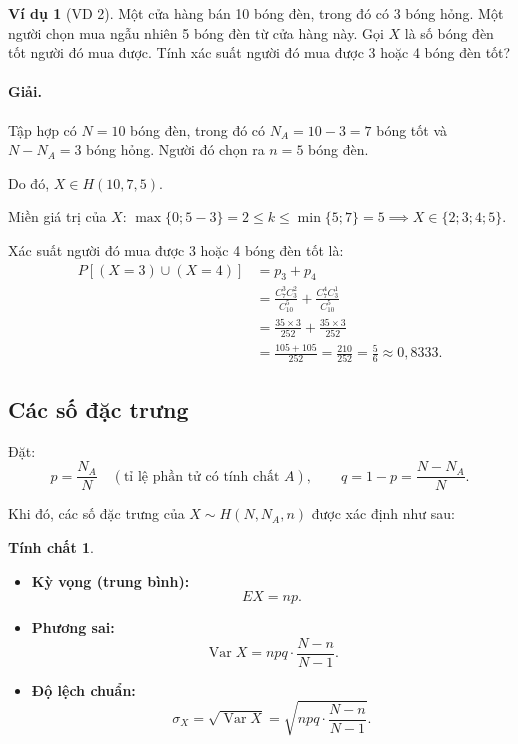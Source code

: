\documentclass[12pt,a4paper]{article}
\theoremstyle{definition}
\newtheorem{vidu}{Ví dụ}[section]
\newtheorem{tinhchat}{Tính chất}[section]
\begin{document}
\begin{vidu}[VD 2]
Một cửa hàng bán 10 bóng đèn, trong đó có 3 bóng hỏng. Một người chọn mua ngẫu nhiên 5 bóng đèn từ cửa hàng này. Gọi $X$ là số bóng đèn tốt người đó mua được. Tính xác suất người đó mua được 3 hoặc 4 bóng đèn tốt?

\paragraph{Giải.}
Tập hợp có $N = 10$ bóng đèn, trong đó có $N_A = 10 - 3 = 7$ bóng tốt và $N - N_A = 3$ bóng hỏng. Người đó chọn ra $n = 5$ bóng đèn.

Do đó, $X \in H(10, 7, 5)$.

Miền giá trị của $X$: $\max\{0; 5 - 3\} = 2 \le k \le \min\{5; 7\} = 5 \implies X \in \{2; 3; 4; 5\}$.

Xác suất người đó mua được 3 hoặc 4 bóng đèn tốt là:
\begin{align*}
P[(X = 3) \cup (X = 4)] &= p_3 + p_4 \\
&= \frac{C_7^3 C_3^2}{C_{10}^5} + \frac{C_7^4 C_3^1}{C_{10}^5} \\
&= \frac{35 \times 3}{252} + \frac{35 \times 3}{252} \\
&= \frac{105 + 105}{252} = \frac{210}{252} = \frac{5}{6} \approx 0{,}8333.
\end{align*}
\end{vidu}

\subsection{Các số đặc trưng}

Đặt:
\[
p = \frac{N_A}{N} \quad (\text{tỉ lệ phần tử có tính chất } A), \qquad q = 1 - p = \frac{N - N_A}{N}.
\]

Khi đó, các số đặc trưng của $X \sim H(N, N_A, n)$ được xác định như sau:
\begin{tinhchat}
\begin{itemize}
    \item \textbf{Kỳ vọng (trung bình):}
    \[
    EX = np.
    \]
    \item \textbf{Phương sai:}
    \[
    \operatorname{Var} X = npq \cdot \frac{N - n}{N - 1}.
    \]
    \item \textbf{Độ lệch chuẩn:}
    \[
    \sigma_X = \sqrt{\operatorname{Var} X} = \sqrt{npq \cdot \frac{N - n}{N - 1}}.
    \]
\end{itemize}
\end{tinhchat}
\end{document}
